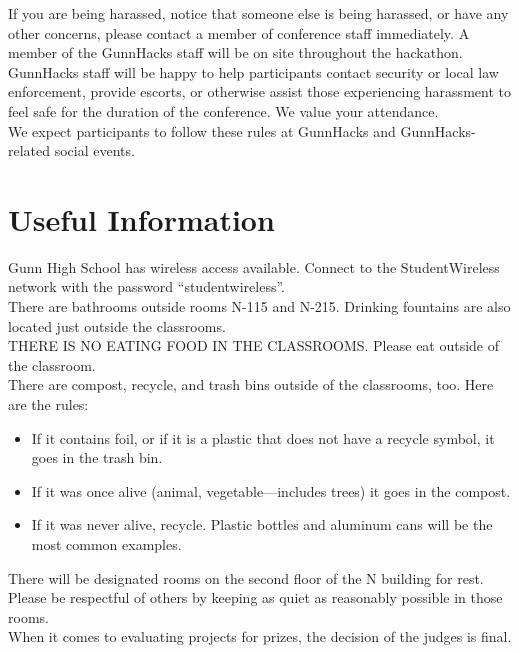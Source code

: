 \documentclass[12pt,onesided,letterpaper]{article}
\begin{document}
If you are being harassed, notice that someone else is being harassed, or have any other concerns, please contact a member of conference staff immediately. A member of the GunnHacks staff will be on site throughout the hackathon.\\

GunnHacks staff will be happy to help participants contact security or local law enforcement, provide escorts, or otherwise assist those experiencing harassment to feel safe for the duration of the conference. We value your attendance.\\

We expect participants to follow these rules at GunnHacks and GunnHacks-related social events. 

\section*{Useful Information}

Gunn High School has wireless access available. Connect to the StudentWireless network with the password ``studentwireless''.\\

There are bathrooms outside rooms N-115 and N-215. Drinking fountains are also located just outside the classrooms.\\

THERE IS NO EATING FOOD IN THE CLASSROOMS. Please eat outside of the classroom.\\

There are compost, recycle, and trash bins outside of the classrooms, too.  Here are the rules:
\begin{itemize}
\item If it contains foil, or if it is a plastic that does not have a recycle symbol, it goes in the trash bin.
\item If it was once alive (animal, vegetable---includes trees) it goes in the compost.
\item If it was never alive, recycle.  Plastic bottles and aluminum cans will be the most common examples.
\end{itemize}

There will be designated rooms on the second floor of the N building for rest. Please be respectful of others by keeping as quiet as reasonably possible in those rooms.\\

When it comes to evaluating projects for prizes, the decision of the judges is final.\\
\end{document}
